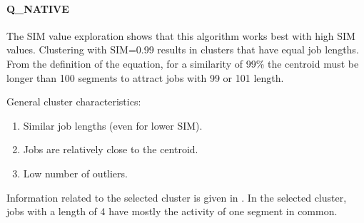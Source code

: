 \documentclass{jhps}
\begin{document}
\FloatBarrier
\paragraph{Q\_NATIVE}
The SIM value exploration shows that this algorithm works best with high SIM values.
Clustering with SIM=0.99 results in clusters that have equal job lengths.
From the definition of the equation, for a similarity of 99\% the centroid must be longer than 100 segments to attract jobs with 99 or 101 length.

General cluster characteristics:
\begin{enumerate}
 \item Similar job lengths (even for lower SIM).
 \item Jobs are relatively close to the centroid.
 \item Low number of outliers.
\end{enumerate}

Information related to the selected cluster is given in .
In the selected cluster, jobs with a length of 4 have mostly the activity of one segment in common.
\end{document}
